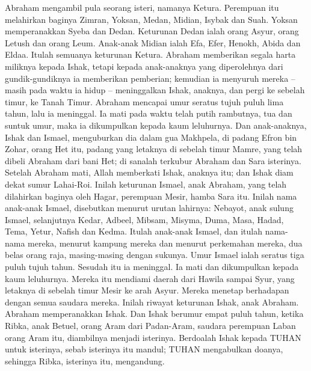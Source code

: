 \begin{biblechapter} %
 Abraham mengambil pula seorang isteri, namanya Ketura.
\verse Perempuan itu melahirkan baginya Zimran, Yoksan, Medan, Midian, Isybak dan Suah.
\verse Yoksan memperanakkan Syeba dan Dedan. Keturunan Dedan ialah orang Asyur, orang Letush dan orang Leum.
\verse Anak-anak Midian ialah Efa, Efer, Henokh, Abida dan Eldaa. Itulah semuanya keturunan Ketura.
\verse Abraham memberikan segala harta miliknya kepada Ishak,
\verse tetapi kepada anak-anaknya yang diperolehnya dari gundik-gundiknya ia memberikan pemberian; kemudian ia menyuruh mereka -- masih pada waktu ia hidup -- meninggalkan Ishak, anaknya, dan pergi ke sebelah timur, ke Tanah Timur.
 Abraham mencapai umur seratus tujuh puluh lima tahun,
\verse lalu ia meninggal. Ia mati pada waktu telah putih rambutnya, tua dan suntuk umur, maka ia dikumpulkan kepada kaum leluhurnya.
\verse Dan anak-anaknya, Ishak dan Ismael, menguburkan dia dalam gua Makhpela, di padang Efron bin Zohar, orang Het itu, padang yang letaknya di sebelah timur Mamre,
\verse yang telah dibeli Abraham dari bani Het; di sanalah terkubur Abraham dan Sara isterinya.
\verse Setelah Abraham mati, Allah memberkati Ishak, anaknya itu; dan Ishak diam dekat sumur Lahai-Roi.
 Inilah keturunan Ismael, anak Abraham, yang telah dilahirkan baginya oleh Hagar, perempuan Mesir, hamba Sara itu.
\verse Inilah nama anak-anak Ismael, disebutkan menurut urutan lahirnya: Nebayot, anak sulung Ismael, selanjutnya Kedar, Adbeel, Mibsam,
\verse Misyma, Duma, Masa,
\verse Hadad, Tema, Yetur, Nafish dan Kedma.
\verse Itulah anak-anak Ismael, dan itulah nama-nama mereka, menurut kampung mereka dan menurut perkemahan mereka, dua belas orang raja, masing-masing dengan sukunya.
\verse Umur Ismael ialah seratus tiga puluh tujuh tahun. Sesudah itu ia meninggal. Ia mati dan dikumpulkan kepada kaum leluhurnya.
\verse Mereka itu mendiami daerah dari Hawila sampai Syur, yang letaknya di sebelah timur Mesir ke arah Asyur. Mereka menetap berhadapan dengan semua saudara mereka.
 Inilah riwayat keturunan Ishak, anak Abraham. Abraham memperanakkan Ishak.
\verse Dan Ishak berumur empat puluh tahun, ketika Ribka, anak Betuel, orang Aram dari Padan-Aram, saudara perempuan Laban orang Aram itu, diambilnya menjadi isterinya.
\verse Berdoalah Ishak kepada TUHAN untuk isterinya, sebab isterinya itu mandul; TUHAN mengabulkan doanya, sehingga Ribka, isterinya itu, mengandung.

\end{biblechapter}
